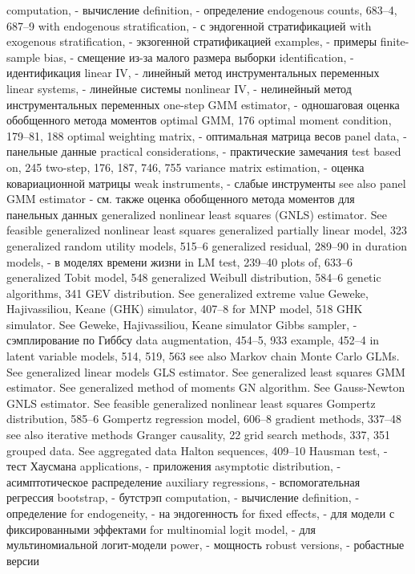 computation, - вычисление
definition, - определение
endogenous counts, 683–4, 687–9
with endogenous stratification, - с эндогенной стратификацией
with exogenous stratification, - экзогенной стратификацией
examples, - примеры
finite-sample bias, - смещение из-за малого размера выборки
identification, - идентификация
linear IV, - линейный метод инструментальных переменных
linear systems, - линейные системы
nonlinear IV, - нелинейный метод инструментальных переменных
one-step GMM estimator, - одношаговая оценка обобщенного метода моментов 
optimal GMM, 176
optimal moment condition, 179–81, 188 
optimal weighting matrix, - оптимальная матрица весов
panel data, - панельные данные
practical considerations, - практические замечания
test based on, 245
two-step, 176, 187, 746, 755
variance matrix estimation, - оценка ковариационной матрицы
weak instruments, - слабые инструменты
see also panel GMM estimator - см. также оценка обобщенного метода моментов для панельных данных
generalized nonlinear least squares (GNLS) estimator.
See feasible generalized nonlinear least squares generalized partially linear model, 323
generalized random utility models, 515–6 generalized residual, 289–90
in duration models, - в моделях времени жизни
in LM test, 239–40 plots of, 633–6
generalized Tobit model, 548
generalized Weibull distribution, 584–6
genetic algorithms, 341
GEV distribution. See generalized extreme value Geweke, Hajivassiliou, Keane (GHK) simulator,
407–8
for MNP model, 518
GHK simulator. See Geweke, Hajivassiliou, Keane simulator
Gibbs sampler, - сэмплирование по Гиббсу
data augmentation, 454–5, 933 example, 452–4
in latent variable models, 514, 519, 563 see also Markov chain Monte Carlo
GLMs. See generalized linear models
GLS estimator. See generalized least squares
GMM estimator. See generalized method of moments GN algorithm. See Gauss-Newton
GNLS estimator. See feasible generalized nonlinear
least squares
Gompertz distribution, 585–6 Gompertz regression model, 606–8 gradient methods, 337–48
see also iterative methods Granger causality, 22
grid search methods, 337, 351 grouped data. See aggregated data
Halton sequences, 409–10 Hausman test, - тест Хаусмана
applications, - приложения
asymptotic distribution, - асимптотическое распределение
auxiliary regressions, - вспомогательная регрессия
bootstrap, - бутстрэп
computation, - вычисление 
definition, - определение
for endogeneity, - на эндогенность
for fixed effects, - для модели с фиксированными эффектами 
for multinomial logit model, - для мультиномиальной логит-модели 
power, - мощность
robust versions, - робастные версии 
